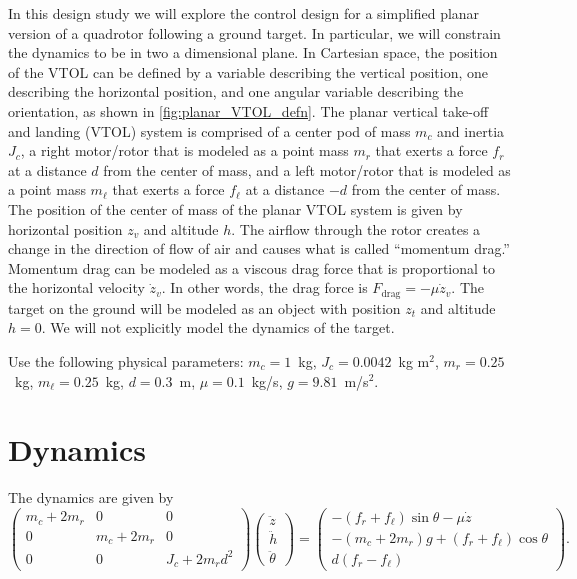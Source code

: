 \documentclass{article}
\begin{document}
In this design study we will explore the control design for a simplified planar version of a quadrotor following a ground target.  In particular, we will constrain the dynamics to be in two a dimensional plane. In Cartesian space, the position of the VTOL can be defined by a variable describing the vertical position, one describing the horizontal position, and one angular variable describing the orientation, as shown in \ref{fig:planar_VTOL_defn}.  The planar vertical take-off and landing (VTOL) system is comprised of a center pod of mass $m_c$ and inertia $J_c$, a right motor/rotor that is modeled as a point mass $m_r$ that exerts a force $f_r$ at a distance $d$ from the center of mass, and a left motor/rotor that is modeled as a point mass $m_\ell$ that exerts a force $f_\ell$ at a distance $-d$ from the center of mass.  The position of the center of mass of the planar VTOL system is given by horizontal position $z_v$ and altitude $h$.  The airflow through the rotor creates a change in the direction of flow of air and causes what is called ``momentum drag.''  Momentum drag can be modeled as a viscous drag force that is proportional to the horizontal velocity $\dot{z}_v$.  In other words, the drag force is $F_{\text{drag}}=-\mu \dot{z}_v$.  The target on the ground will be modeled as an object with position $z_t$ and altitude $h=0$.  We will not explicitly model the dynamics of the target.  

Use the following physical parameters:
$m_c=1$~kg,
$J_c=0.0042$~kg m$^2$,
$m_r=0.25$~kg,
$m_\ell=0.25$~kg,
$d=0.3$~m,
$\mu = 0.1$~kg/s,
$g=9.81$~m/s$^2$.





\section{Dynamics}

The dynamics are given by
\begin{equation}\label{eq:vtol_sim_model}
\begin{pmatrix}
m_c + 2 m_r & 0           & 0 \\
0           & m_c + 2 m_r & 0 \\
0           & 0           & J_c + 2 m_r d^2
\end{pmatrix}
\begin{pmatrix}
\ddot{z} \\
\ddot{h} \\
\ddot{\theta}
\end{pmatrix}
=
\begin{pmatrix}
-(f_r + f_\ell) \sin\theta - \mu\dot{z} \\
-(m_c + 2 m_r) g + (f_r + f_\ell) \cos\theta \\
d \left( f_r - f_\ell \right)
\end{pmatrix}.
\end{equation}
\end{document}
